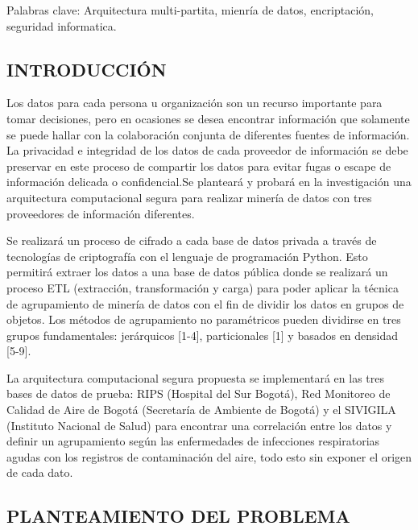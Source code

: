 \documentclass[a4paper, 12pt, oneside]{article}
\theoremstyle{definition}
\theoremstyle{remark}
\begin{document}
Palabras clave: Arquitectura multi-partita, mienría de datos, encriptación, seguridad informatica.

 \clearpage
 
\begin{center}
 \section{INTRODUCCIÓN}
 \end{center}
 
 Los datos para cada persona u organización son un recurso importante para tomar decisiones, pero  en ocasiones se desea encontrar información que solamente se puede hallar con la colaboración conjunta de diferentes fuentes de información. La privacidad e integridad de los datos de cada proveedor de información se debe preservar en este proceso de compartir los datos para evitar fugas o escape de información delicada o confidencial.Se planteará y probará en la investigación una arquitectura computacional segura para realizar minería de datos con tres proveedores de información diferentes.

Se realizará un proceso de cifrado a cada base de datos privada a través de tecnologías de criptografía con el lenguaje de programación Python. Esto permitirá extraer los datos a una base de datos pública donde se realizará un proceso ETL (extracción, transformación y carga) para poder aplicar la técnica de agrupamiento de minería de datos con el fin de dividir los datos en grupos de objetos. Los métodos de agrupamiento no paramétricos pueden dividirse en tres grupos fundamentales: jerárquicos [1-4], particionales [1] y basados en densidad [5-9].

La arquitectura computacional segura propuesta se implementará en las tres bases de datos de prueba: RIPS (Hospital del Sur Bogotá), Red Monitoreo de Calidad de Aire de Bogotá (Secretaría de Ambiente de Bogotá) y el SIVIGILA (Instituto Nacional de Salud) para encontrar una correlación entre los datos y definir un agrupamiento según las enfermedades de infecciones respiratorias agudas con los registros de contaminación del aire, todo esto sin exponer el origen de cada dato.

\clearpage

\begin{center}
 \section{PLANTEAMIENTO DEL PROBLEMA}
 \end{center}
\end{document}
